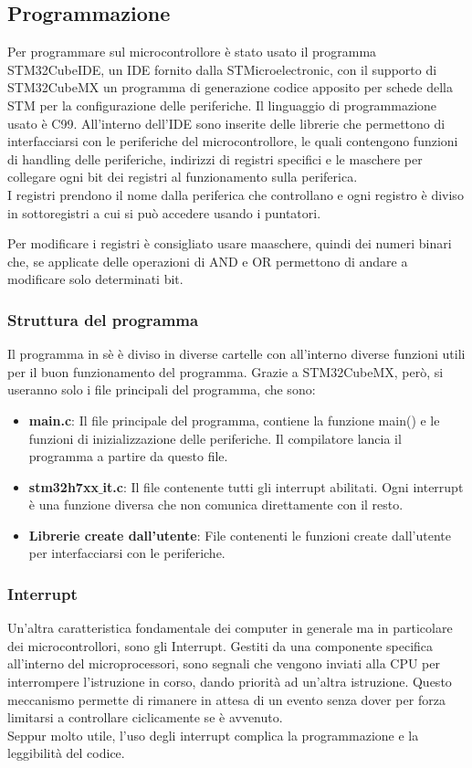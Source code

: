 

\subsection{Programmazione}
Per programmare sul microcontrollore è stato usato il programma STM32CubeIDE, un IDE fornito dalla STMicroelectronic, con il supporto di STM32CubeMX un programma di generazione codice apposito per schede della STM per la configurazione delle periferiche. Il linguaggio di programmazione usato è C99. All'interno dell'IDE sono inserite delle librerie che permettono di interfacciarsi con le periferiche del microcontrollore, le quali contengono funzioni di handling delle periferiche, indirizzi di registri specifici e le maschere per collegare ogni bit dei registri al funzionamento sulla periferica.\\

I registri prendono il nome dalla periferica che controllano e ogni registro è diviso in sottoregistri a cui si può accedere usando i puntatori.

Per modificare i registri è consigliato usare maaschere, quindi dei numeri binari che, se applicate delle operazioni di AND e OR permettono di andare a modificare solo determinati bit.

\subsubsection{Struttura del programma}
Il programma in sè è diviso in diverse cartelle con all'interno diverse funzioni utili per il buon funzionamento del programma.
Grazie a STM32CubeMX, però, si useranno solo i file principali del programma, che sono:
\begin{itemize}
    \item \textbf{main.c}: Il file principale del programma, contiene la funzione main() e le funzioni di inizializzazione delle periferiche. Il compilatore lancia il programma a partire da questo file.
    \item \textbf{stm32h7xx$\_$it.c}: Il file contenente tutti gli interrupt abilitati. Ogni interrupt è una funzione diversa che non comunica direttamente con il resto.
    \item \textbf{Librerie create dall'utente}: File contenenti le funzioni create dall'utente per interfacciarsi con le periferiche.
\end{itemize}

\subsubsection{ Interrupt }
Un'altra caratteristica fondamentale dei computer in generale ma in particolare dei microcontrollori, sono gli Interrupt. Gestiti da una componente specifica all'interno del microprocessori, sono segnali che vengono inviati alla CPU per interrompere l'istruzione in corso, dando priorità ad un'altra istruzione. Questo meccanismo permette di rimanere in attesa di un evento senza dover per forza limitarsi a controllare ciclicamente se è avvenuto.\\
Seppur molto utile, l'uso degli interrupt complica la programmazione e la leggibilità del codice.

